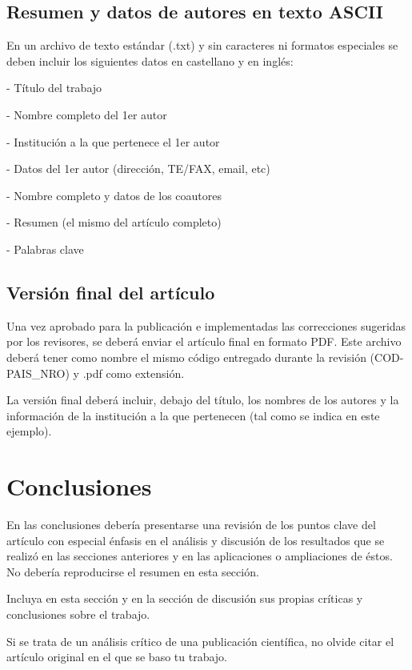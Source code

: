 \documentclass[conference,a4paper,10pt,oneside,final]{tfmpd}
\begin{document}
\subsection{Resumen y datos de autores en texto ASCII}

En un archivo de texto estándar (.txt) y sin caracteres ni formatos especiales se deben incluir los siguientes datos en castellano y en inglés:

- Título del trabajo

- Nombre completo del 1er autor

- Institución a la que pertenece el 1er autor

- Datos del 1er autor (dirección, TE/FAX, email, etc)

- Nombre completo y datos de los coautores

- Resumen (el mismo del artículo completo)

- Palabras clave

\subsection{Versión final del artículo}

Una vez aprobado para la publicación e implementadas las correcciones sugeridas por los revisores, se deberá enviar el artículo final en formato PDF. Este archivo deberá tener como nombre el mismo código entregado durante la revisión (COD-PAIS\_NRO) y .pdf como extensión.

La versión final deberá incluir, debajo del título, los nombres de los autores y la información de la institución a la que pertenecen (tal como se indica en este ejemplo).

\section{Conclusiones}

En las conclusiones debería presentarse una revisión de los puntos clave del artículo con especial énfasis en el análisis y discusión de los resultados que se realizó en las secciones anteriores y en las aplicaciones o ampliaciones de éstos. No debería reproducirse el resumen en esta sección.

Incluya en esta sección y en la sección de discusión sus propias críticas y conclusiones sobre el trabajo.

Si se trata de un análisis crítico de una publicación científica, no olvide citar el artículo original en el que se baso tu trabajo.
\end{document}
